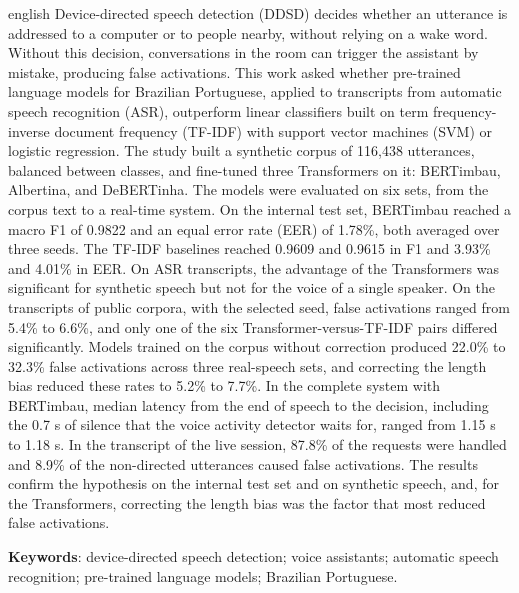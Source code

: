 \documentclass[
    12pt,                %
    openright,           %
    oneside,             %
    a4paper,             %
    english,             %
    brazil               %
]{abntex2}
\begin{document}
\begin{resumo}[Abstract]
\begin{otherlanguage*}{english}
Device-directed speech detection (DDSD) decides whether an utterance is addressed to a computer or to people nearby, without relying on a wake word. Without this decision, conversations in the room can trigger the assistant by mistake, producing false activations. This work asked whether pre-trained language models for Brazilian Portuguese, applied to transcripts from automatic speech recognition (ASR), outperform linear classifiers built on term frequency-inverse document frequency (TF-IDF) with support vector machines (SVM) or logistic regression. The study built a synthetic corpus of 116,438 utterances, balanced between classes, and fine-tuned three Transformers on it: BERTimbau, Albertina, and DeBERTinha. The models were evaluated on six sets, from the corpus text to a real-time system. On the internal test set, BERTimbau reached a macro F1 of 0.9822 and an equal error rate (EER) of 1.78\%, both averaged over three seeds. The TF-IDF baselines reached 0.9609 and 0.9615 in F1 and 3.93\% and 4.01\% in EER. On ASR transcripts, the advantage of the Transformers was significant for synthetic speech but not for the voice of a single speaker. On the transcripts of public corpora, with the selected seed, false activations ranged from 5.4\% to 6.6\%, and only one of the six Transformer-versus-TF-IDF pairs differed significantly. Models trained on the corpus without correction produced 22.0\% to 32.3\% false activations across three real-speech sets, and correcting the length bias reduced these rates to 5.2\% to 7.7\%. In the complete system with BERTimbau, median latency from the end of speech to the decision, including the 0.7 s of silence that the voice activity detector waits for, ranged from 1.15 s to 1.18 s. In the transcript of the live session, 87.8\% of the requests were handled and 8.9\% of the non-directed utterances caused false activations. The results confirm the hypothesis on the internal test set and on synthetic speech, and, for the Transformers, correcting the length bias was the factor that most reduced false activations.

\vspace{\onelineskip}

\noindent
\textbf{Keywords}: device-directed speech detection; voice assistants; automatic speech recognition; pre-trained language models; Brazilian Portuguese.
\end{otherlanguage*}
\end{resumo}
\end{document}
